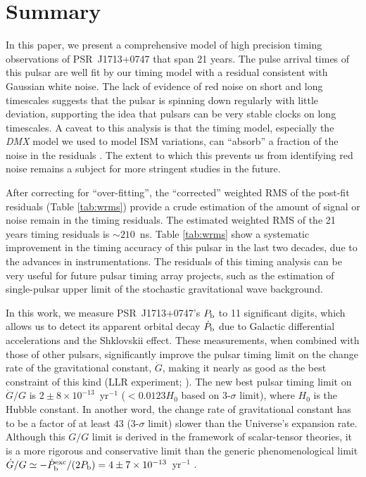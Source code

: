 \section{Summary}
In this paper, we present a comprehensive model of high precision timing observations of
PSR~J1713+0747 that span 21 years. 
The pulse arrival times of this pulsar are well fit by our timing model with a
residual consistent with Gaussian white noise.
The lack of evidence of red noise on short and long timescales suggests that
the pulsar is spinning down regularly with little deviation, supporting the
idea that pulsars can be very stable clocks on long timescales.
A caveat to this analysis is that the timing model, especially the
\textit{DMX} model we used to model ISM variations, can ``absorb'' a fraction
of the noise in the residuals \citep{kcs+13}. The extent to which this prevents us from
identifying red noise remains a subject for more stringent studies in the
future.

After correcting for ``over-fitting'', the ``corrected'' weighted RMS of the post-fit residuals (Table \ref{tab:wrms}) provide a crude estimation of
the amount of signal or noise remain in the timing residuals. The estimated
weighted RMS of the 21 years timing residuals is $\sim 210$~ns. 
Table \ref{tab:wrms} show a systematic improvement in the timing accuracy of
this pulsar in the last two decades, due to the advances in instrumentations.
The residuals of this timing analysis can be very useful for future pulsar timing array
projects, such as the estimation of single-pulsar upper limit of the stochastic gravitational wave background.


In this work, we measure PSR~J1713+0747's $P_{\rm b}$ to 11 significant
digits, which allows us to detect its apparent orbital decay $\dot{P}_{\rm b}$
due to Galactic differential accelerations and the Shklovskii effect.
These measurements, when combined with those of other pulsars, 
significantly improve the pulsar timing limit on the change rate of the gravitational
 constant, $\dot{G}$, making it nearly as good as the best
 constraint of this kind (LLR experiment; \citep{hmb10}).
The new best pulsar timing limit on $\dot{G}/G$ is 
$2\pm8\times10^{-13}$~yr$^{-1}$ ($<0.0123H_0$ based on 3-$\sigma$ limit), where $H_0$ is the Hubble constant. 
In another word, the change rate of gravitational constant has to be a factor
of at least $43$ (3-$\sigma$ limit) slower than the Universe's expansion rate.
Although this $\dot{G}/G$ limit is derived in the
framework of scalar-tensor theories, it is a more rigorous and conservative
limit than the generic phenomenological limit 
$\dot{G}/G\simeq-\dot{P}_{\rm b}^{\rm exc}/(2P_{\rm
b})=4\pm7\times10^{-13}$~yr$^{-1}$ \citep{dgt88}.


